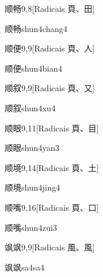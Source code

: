 \begin{entry}{顺畅}{9,8}[Radicais ⾴、⽥]
  \begin{phonetics}{顺畅}{shun4chang4}
  \end{phonetics}
\end{entry}

\begin{entry}{顺便}{9,9}[Radicais ⾴、⼈]
  \begin{phonetics}{顺便}{shun4bian4}
  \end{phonetics}
\end{entry}

\begin{entry}{顺叙}{9,9}[Radicais ⾴、⼜]
  \begin{phonetics}{顺叙}{shun4xu4}
  \end{phonetics}
\end{entry}

\begin{entry}{顺眼}{9,11}[Radicais ⾴、⽬]
  \begin{phonetics}{顺眼}{shun4yan3}
  \end{phonetics}
\end{entry}

\begin{entry}{顺境}{9,14}[Radicais ⾴、⼟]
  \begin{phonetics}{顺境}{shun4jing4}
  \end{phonetics}
\end{entry}

\begin{entry}{顺嘴}{9,16}[Radicais ⾴、⼝]
  \begin{phonetics}{顺嘴}{shun4zui3}
  \end{phonetics}
\end{entry}

\begin{entry}{飒飒}{9,9}[Radicais ⾵、⾵]
  \begin{phonetics}{飒飒}{sa4sa4}
  \end{phonetics}
\end{entry}

